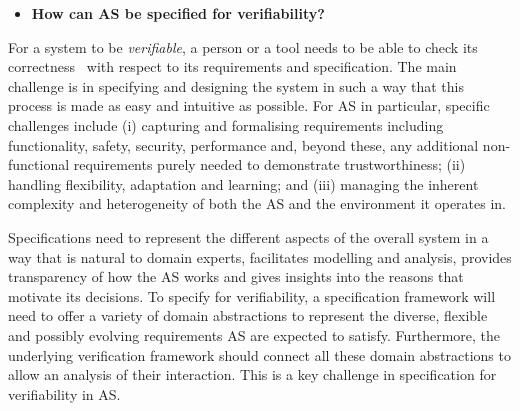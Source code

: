 \documentclass[sigconf,nonacm]{acmart}%
\begin{document}
	\begin{itemize}[leftmargin=0.5cm]
		\item \textbf{How can AS be specified for verifiability?}
	\end{itemize}
	For a system to be {\em verifiable\/}, a person or a tool needs to be able to check its correctness~\cite{ISO24765:2017} with respect to its requirements and specification. 
	The main challenge is in specifying and designing the system in such a way that this process is made as easy and intuitive as possible.
	For AS in particular, specific challenges include 
	(i) capturing and formalising requirements including functionality, safety, security, performance and, beyond these, any additional non-functional requirements purely needed to demonstrate trustworthiness; 
	(ii) handling flexibility, adaptation and learning; and 
	(iii) managing the inherent complexity and heterogeneity of both the AS and the environment it operates in. 
	
	Specifications need to represent the different aspects of the overall system in a way that is natural to domain experts, facilitates modelling and analysis, provides transparency of how the AS works and gives insights into the reasons that motivate its decisions. 
	To specify for verifiability, a specification framework will need to offer a variety of domain abstractions to represent the diverse, flexible and possibly evolving requirements AS are expected to satisfy. 
	Furthermore, the underlying verification framework should connect all these domain abstractions to allow an analysis of their interaction. This is a key challenge in specification for verifiability in AS.
	
\end{document}
